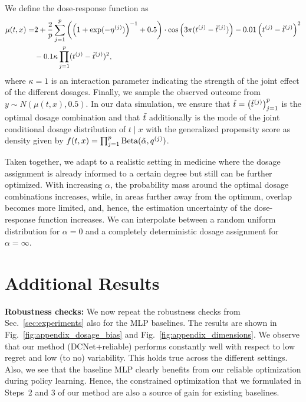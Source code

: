 We define the dose-response function as
\begin{align}
    \mu(t, x) =  & 2 + \frac{2}{p}\sum_{j=1}^p  \left(\left(1+\exp(-\eta^{(j)})\right)^{-1}+0.5\right) \cdot \cos \left(  3 \pi(t^{(j)} - \Tilde{t}^{(j)}) \right)  
     - 0.01 \left(t^{(j)} - \Tilde{t}^{(j)}\right)^2 \nonumber \\
    & - 0.1 \kappa \prod_{j=1}^p  (t^{(j)} - \Tilde{t}^{(j)})^2,
\end{align}
where $\kappa=1$ is an interaction parameter indicating the strength of the joint effect of the different dosages. Finally, we sample the observed outcome from $y \sim N(\mu(t, x), 0.5) $. In our data simulation, we ensure that $\Tilde{t} = \left(\Tilde{t}^{(j)}\right)_{j=1}^p$ is the optimal dosage combination and that $\Tilde{t}$ additionally is the mode of the joint conditional dosage distribution of $t\mid x$ with the generalized propensity score as density given by $ f(t, x) =  \prod_{j=1}^p \text{Beta}(\Tilde{\alpha},q^{(j)})$. 

Taken together, we adapt to a realistic setting in medicine where the dosage assignment is already informed to a certain degree but still can be further optimized. With increasing $\alpha$, the probability mass around the optimal dosage combinations increases, while, in areas further away from the optimum, overlap becomes more limited, and, hence, the estimation uncertainty of the dose-response function increases. We can interpolate between a random uniform distribution for $\alpha=0$ and a completely deterministic dosage assignment for $\alpha=\infty$.



\clearpage

\section{Additional Results} \label{sec:appendix_experiments}

\textbf{Robustness checks:} We now repeat the robustness checks from Sec.~\ref{sec:experiments} also for the MLP baselines. The results are shown in Fig.~\ref{fig:appendix_dosage_bias} and Fig.~\ref{fig:appendix_dimensions}. We observe that our method (DCNet+reliable) performs constantly well with respect to low regret and low (to no) variability. This holds true across the different settings. Also, we see that the baseline MLP clearly benefits from our reliable optimization during policy learning. Hence, the constrained optimization that we formulated in Steps~2 and 3 of our method are also a source of gain for existing baselines. 

